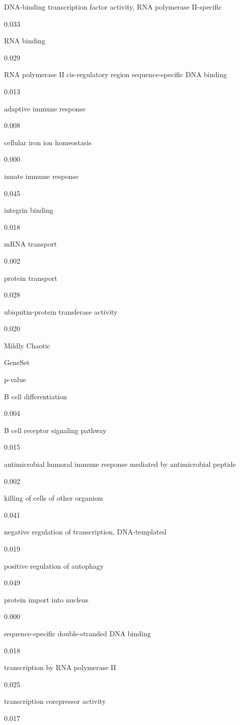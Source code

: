 \documentclass[
  letterpaper,
  DIV=11,
  numbers=noendperiod,
  openany,
  oneside]{scrreprt}
\begin{document}
DNA-binding transcription factor activity, RNA polymerase II-specific

0.033

RNA binding

0.029

RNA polymerase II cis-regulatory region sequence-specific DNA binding

0.013

adaptive immune response

0.008

cellular iron ion homeostasis

0.000

innate immune response

0.045

integrin binding

0.018

mRNA transport

0.002

protein transport

0.028

ubiquitin-protein transferase activity

0.020

Mildly Chaotic

GeneSet

p-value

B cell differentiation

0.004

B cell receptor signaling pathway

0.015

antimicrobial humoral immune response mediated by antimicrobial peptide

0.002

killing of cells of other organism

0.041

negative regulation of transcription, DNA-templated

0.019

positive regulation of autophagy

0.049

protein import into nucleus

0.000

sequence-specific double-stranded DNA binding

0.018

transcription by RNA polymerase II

0.025

transcription corepressor activity

0.017
\end{document}
